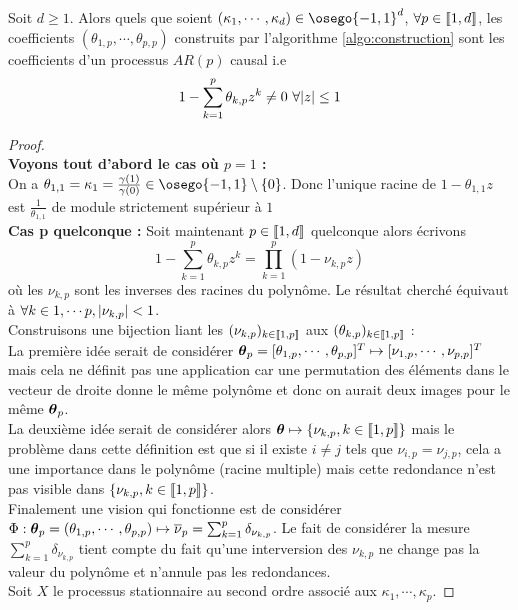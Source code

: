 \documentclass{report}
\begin{document}
\begin{Thm}
\label{thm:kappa}
Soit $d \geq 1$. Alors quels que soient $(\kappa_1,\cdots, \kappa_d)\in \osego{-1,1}^d$, $\forall p \in { \left\llbracket 1,d \right\rrbracket}$, les coefficients $(\theta_{1,p}, \cdots, \theta_{p,p})$ construits par l'algorithme \ref{algo:construction} sont les coefficients d'un processus $AR(p)$ causal i.e 
$$
1-\sum_{k=1}^p \theta_{k,p} z^k \neq 0 \,\, \forall { \left| z \right|} \leq 1
$$
\end{Thm}
\begin{proof}~\\
\textbf{Voyons tout d'abord le cas où $p=1$ :} \\
On a $\theta_{1,1} = \kappa_1 = \frac{\gamma(1)}{\gamma(0)} \in \osego{-1,1} \setminus \ens{0}$. Donc l'unique racine de $1-\theta_{1,1}z$ est $\frac{1}{\theta_{1,1}}$ de module strictement supérieur à $1$ \\
\textbf{Cas p quelconque :} Soit maintenant $p \in { \left\llbracket 1,d \right\rrbracket}$ quelconque alors écrivons 
$$
1- \sum_{k=1}^p \theta_{k,p} z^k = \prod_{k=1}^p (1-\nu_{k,p} z)
$$
où les $\nu_{k,p}$ sont les inverses des racines du polynôme. Le résultat cherché équivaut à $\forall k\in {1,\cdots p}, { \left| \nu_{k,p} \right|} < 1$. \\
Construisons une bijection liant les $(\nu_{k,p})_{k\in { \left\llbracket 1,p \right\rrbracket}}$ aux $(\theta_{k,p})_{k\in { \left\llbracket 1,p \right\rrbracket}}$ : \\
La première idée serait de considérer $\boldsymbol{\theta}_p=[\theta_{1,p},\cdots,\theta_{p,p}]^T \mapsto [\nu_{1,p},\cdots,\nu_{p,p}]^T$ mais cela ne définit pas une application car une permutation des éléments dans le vecteur de droite donne le même polynôme et donc on aurait deux images pour le même $\boldsymbol{\theta}_p$. \\
La deuxième idée serait de considérer alors $\boldsymbol{\theta} \mapsto { \left\lbrace  \nu_{k,p}, k\in { \left\llbracket 1,p \right\rrbracket} \right\rbrace }$ mais le problème dans cette définition est que si il existe $i \neq j$ tels que $\nu_{i,p}=\nu_{j,p}$, cela a une importance dans le polynôme (racine multiple) mais cette redondance n'est pas visible dans ${ \left\lbrace  \nu_{k,p}, k\in { \left\llbracket 1,p \right\rrbracket} \right\rbrace }$. \\
Finalement une vision qui fonctionne est de considérer $\Phi : \boldsymbol{\theta}_p = (\theta_{1,p}, \cdots, \theta_{p,p}) \mapsto \overline{\nu}_p = \sum_{k=1}^p \delta_{\nu_{k,p}}$. Le fait de considérer la mesure $\sum_{k=1}^p \delta_{\nu_{k,p}}$ tient compte du fait qu'une interversion des $\nu_{k,p}$ ne change pas la valeur du polynôme et n'annule pas les redondances. \\
Soit $X$ le processus stationnaire au second ordre associé aux $\kappa_1,\cdots,\kappa_p$.

\end{proof}
\end{document}
